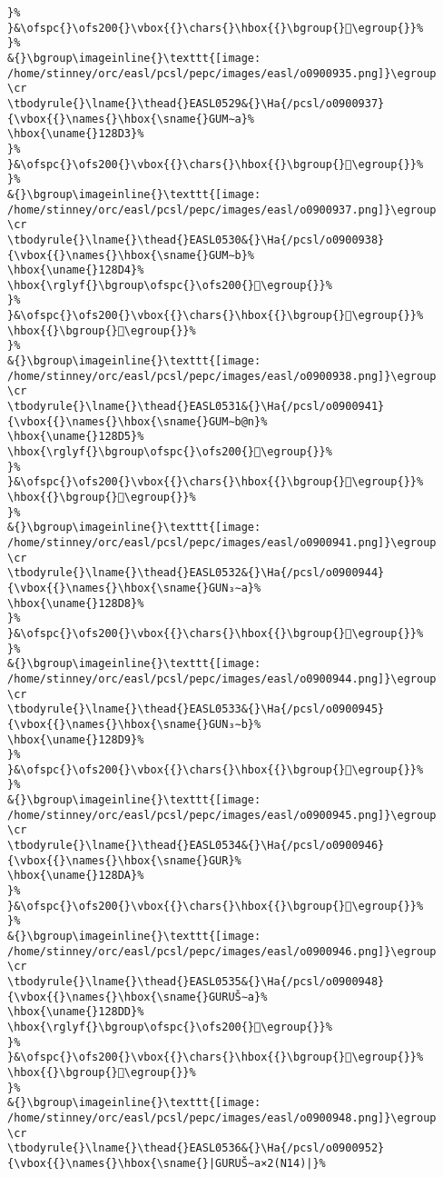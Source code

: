 \begin{verbatim}
}%
}&\ofspc{}\ofs200{}\vbox{{}\chars{}\hbox{{}\bgroup{}𒣒\egroup{}}%
}%
&{}\bgroup\imageinline{}\texttt{[image: /home/stinney/orc/easl/pcsl/pepc/images/easl/o0900935.png]}\egroup
\cr
\tbodyrule{}\lname{}\thead{}EASL0529&{}\Ha{/pcsl/o0900937}{\vbox{{}\names{}\hbox{\sname{}GUM∼a}%
\hbox{\uname{}128D3}%
}%
}&\ofspc{}\ofs200{}\vbox{{}\chars{}\hbox{{}\bgroup{}𒣓\egroup{}}%
}%
&{}\bgroup\imageinline{}\texttt{[image: /home/stinney/orc/easl/pcsl/pepc/images/easl/o0900937.png]}\egroup
\cr
\tbodyrule{}\lname{}\thead{}EASL0530&{}\Ha{/pcsl/o0900938}{\vbox{{}\names{}\hbox{\sname{}GUM∼b}%
\hbox{\uname{}128D4}%
\hbox{\rglyf{}\bgroup\ofspc{}\ofs200{}𒣔\egroup{}}%
}%
}&\ofspc{}\ofs200{}\vbox{{}\chars{}\hbox{{}\bgroup{}𒣔\egroup{}}%
\hbox{{}\bgroup{}𒣗\egroup{}}%
}%
&{}\bgroup\imageinline{}\texttt{[image: /home/stinney/orc/easl/pcsl/pepc/images/easl/o0900938.png]}\egroup
\cr
\tbodyrule{}\lname{}\thead{}EASL0531&{}\Ha{/pcsl/o0900941}{\vbox{{}\names{}\hbox{\sname{}GUM∼b@n}%
\hbox{\uname{}128D5}%
\hbox{\rglyf{}\bgroup\ofspc{}\ofs200{}𒣕\egroup{}}%
}%
}&\ofspc{}\ofs200{}\vbox{{}\chars{}\hbox{{}\bgroup{}𒣕\egroup{}}%
\hbox{{}\bgroup{}𒣖\egroup{}}%
}%
&{}\bgroup\imageinline{}\texttt{[image: /home/stinney/orc/easl/pcsl/pepc/images/easl/o0900941.png]}\egroup
\cr
\tbodyrule{}\lname{}\thead{}EASL0532&{}\Ha{/pcsl/o0900944}{\vbox{{}\names{}\hbox{\sname{}GUN₃∼a}%
\hbox{\uname{}128D8}%
}%
}&\ofspc{}\ofs200{}\vbox{{}\chars{}\hbox{{}\bgroup{}𒣘\egroup{}}%
}%
&{}\bgroup\imageinline{}\texttt{[image: /home/stinney/orc/easl/pcsl/pepc/images/easl/o0900944.png]}\egroup
\cr
\tbodyrule{}\lname{}\thead{}EASL0533&{}\Ha{/pcsl/o0900945}{\vbox{{}\names{}\hbox{\sname{}GUN₃∼b}%
\hbox{\uname{}128D9}%
}%
}&\ofspc{}\ofs200{}\vbox{{}\chars{}\hbox{{}\bgroup{}𒣙\egroup{}}%
}%
&{}\bgroup\imageinline{}\texttt{[image: /home/stinney/orc/easl/pcsl/pepc/images/easl/o0900945.png]}\egroup
\cr
\tbodyrule{}\lname{}\thead{}EASL0534&{}\Ha{/pcsl/o0900946}{\vbox{{}\names{}\hbox{\sname{}GUR}%
\hbox{\uname{}128DA}%
}%
}&\ofspc{}\ofs200{}\vbox{{}\chars{}\hbox{{}\bgroup{}𒣚\egroup{}}%
}%
&{}\bgroup\imageinline{}\texttt{[image: /home/stinney/orc/easl/pcsl/pepc/images/easl/o0900946.png]}\egroup
\cr
\tbodyrule{}\lname{}\thead{}EASL0535&{}\Ha{/pcsl/o0900948}{\vbox{{}\names{}\hbox{\sname{}GURUŠ∼a}%
\hbox{\uname{}128DD}%
\hbox{\rglyf{}\bgroup\ofspc{}\ofs200{}𒣝\egroup{}}%
}%
}&\ofspc{}\ofs200{}\vbox{{}\chars{}\hbox{{}\bgroup{}𒣛\egroup{}}%
\hbox{{}\bgroup{}𒣝\egroup{}}%
}%
&{}\bgroup\imageinline{}\texttt{[image: /home/stinney/orc/easl/pcsl/pepc/images/easl/o0900948.png]}\egroup
\cr
\tbodyrule{}\lname{}\thead{}EASL0536&{}\Ha{/pcsl/o0900952}{\vbox{{}\names{}\hbox{\sname{}|GURUŠ∼a×2(N14)|}%

\end{verbatim}
